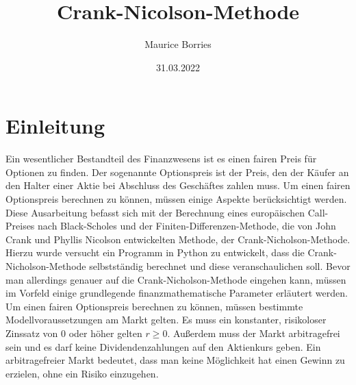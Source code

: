 \documentclass[12pt,titlepage]{article}
\begin{document}
\begin{titlepage}
\title{Crank-Nicolson-Methode}
\date{31.03.2022}
\author{Maurice Borries}
\maketitle
\end{titlepage}

\tableofcontents
\newpage
\section{Einleitung}
Ein wesentlicher Bestandteil des Finanzwesens ist es einen fairen Preis für Optionen zu finden. Der sogenannte Optionspreis ist der Preis, den der Käufer an den Halter einer Aktie bei Abschluss des Geschäftes zahlen muss. Um einen fairen Optionspreis berechnen zu können, müssen einige Aspekte berücksichtigt werden. Diese Ausarbeitung befasst sich mit der Berechnung eines europäischen Call-Preises nach Black-Scholes und der Finiten-Differenzen-Methode, die von John Crank und Phyllis Nicolson entwickelten Methode, der Crank-Nicholson-Methode. Hierzu wurde versucht ein Programm in Python zu entwickelt, dass die Crank-Nicholson-Methode selbstständig berechnet und diese veranschaulichen soll.
Bevor man allerdings genauer auf die Crank-Nicholson-Methode eingehen kann, müssen im Vorfeld einige grundlegende finanzmathematische Parameter erläutert werden. 
Um einen fairen Optionspreis berechnen zu können, müssen bestimmte Modellvoraussetzungen am Markt gelten. Es muss ein konstanter, risikoloser Zinssatz von 0 oder höher gelten $r\geq{0}$. Außerdem muss der Markt arbitragefrei sein und es darf keine Dividendenzahlungen auf den Aktienkurs geben. Ein arbitragefreier Markt bedeutet, dass man keine Möglichkeit hat einen Gewinn zu erzielen, ohne ein Risiko einzugehen. 
\\\\
\end{document}
